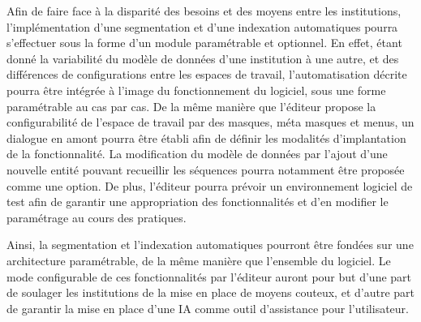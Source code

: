 Afin de faire face à la disparité des besoins et des moyens entre les institutions, l'implémentation d'une segmentation et d'une indexation automatiques pourra s'effectuer sous la forme d'un module paramétrable et optionnel. En effet, étant donné la variabilité du modèle de données d'une institution à une autre, et des différences de configurations entre les espaces de travail, l'automatisation décrite pourra être intégrée à l'image du fonctionnement du logiciel, sous une forme paramétrable au cas par cas. De la même manière que l'éditeur propose la configurabilité de l'espace de travail par des masques, méta masques et menus, un dialogue en amont pourra être établi afin de définir les modalités d'implantation de la fonctionnalité. La modification du modèle de données par l'ajout d'une nouvelle entité pouvant recueillir les séquences pourra notamment être proposée comme une option. De plus, l'éditeur pourra prévoir un environnement logiciel de test afin de garantir une appropriation des fonctionnalités et d'en modifier le paramétrage au cours des pratiques. 

Ainsi, la segmentation et l'indexation automatiques pourront être fondées sur une architecture paramétrable, de la même manière que l'ensemble du logiciel. Le mode configurable de ces fonctionnalités par l'éditeur auront pour but d'une part de soulager les institutions de la mise en place de moyens couteux, et d'autre part de garantir la mise en place d'une IA comme outil d'assistance pour l'utilisateur.  


